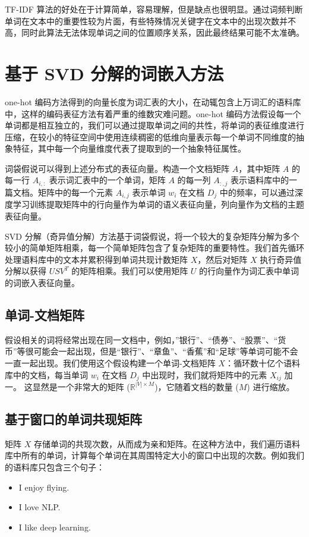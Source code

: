 TF-IDF 算法的好处在于计算简单，容易理解，但是缺点也很明显。通过词频判断单词在文本中的重要性较为片面，有些特殊情况关键字在文本中的出现次数并不高，同时此算法无法体现单词之间的位置顺序关系，因此最终结果可能不太准确。


\section{基于 SVD 分解的词嵌入方法}
one-hot 编码方法得到的向量长度为词汇表的大小，在动辄包含上万词汇的语料库中，这样的编码表征方法有着严重的维数灾难问题。one-hot 编码方法假设每一个单词都是相互独立的，我们可以通过提取单词之间的共性，将单词的表征维度进行压缩，在较小的特征空间中使用连续稠密的低维向量表示每一个单词不同维度的抽象特征，其中每一个向量维度代表了提取到的一个抽象特征属性。

词袋假说可以得到上述分布式的表征向量。构造一个文档矩阵 $A$，其中矩阵 $A$ 的每一行 $A_{i,:}$ 表示词汇表中的一个单词，矩阵 $A$ 的每一列 $A_{:,j}$ 表示语料库中的一篇文档。矩阵中的每一个元素 $A_{i,j}$ 表示单词 $w_i$ 在文档 $D_j$ 中的频率，可以通过深度学习训练提取矩阵中的行向量作为单词的语义表征向量，列向量作为文档的主题表征向量。

SVD 分解（奇异值分解）方法基于词袋假说，将一个较大的复杂矩阵分解为多个较小的简单矩阵相乘，每一个简单矩阵包含了复杂矩阵的重要特性。我们首先循环处理语料库中的文本并累积得到单词共现计数矩阵 $X$，然后对矩阵 $X$ 执行奇异值分解以获得 $USV^{T}$ 的矩阵相乘。我们可以使用矩阵 $U$ 的行向量作为词汇表中单词的词嵌入表征向量。

\subsection{单词-文档矩阵}
假设相关的词将经常出现在同一文档中，例如，”银行”、“债券”、“股票”、“货币”等很可能会一起出现，但是“银行”、“章鱼”、“香蕉”和“足球”等单词可能不会一直一起出现。我们使用这个假设构建一个单词-文档矩阵 $X$：循环数十亿个语料库中的文档，每当单词 $w_i$ 在文档 $D_j$ 中出现时，我们就将矩阵中的元素 $X_{ij}$ 加一。 这显然是一个非常大的矩阵 ($\mathbb{R}^{|V| \times M}$)，它随着文档的数量 ($M$) 进行缩放。

\subsection{基于窗口的单词共现矩阵}
矩阵 $X$ 存储单词的共现次数，从而成为亲和矩阵。在这种方法中，我们遍历语料库中所有的单词，计算每个单词在其周围特定大小的窗口中出现的次数。例如我们的语料库只包含三个句子：
\begin{itemize}
    \item I enjoy flying.
    \item I love NLP.
    \item I like deep learning.
\end{itemize}

